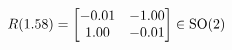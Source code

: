 \documentclass[preview]{standalone}
\begin{document}
\begin{align*}
\special{dvisvgm:raw <g id='unique000'>}R(1.58) = \begin{bmatrix} -0.01 & -1.00 \\ 1.00 & -0.01 \end{bmatrix} \in \text{SO}(2)\special{dvisvgm:raw </g>}
\end{align*}
\end{document}
